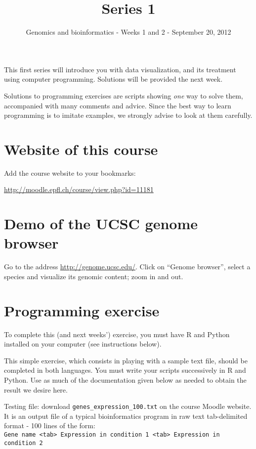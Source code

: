 \documentclass[a4paper,11pt]{article}
\title{Series 1}
\date{}
\author{Genomics and bioinformatics - Weeks 1 and 2 - September 20, 2012}
\begin{document}
\maketitle

This first series will introduce you with data visualization, and its treatment using computer programming.
Solutions will be provided the next week. 

Solutions to programming exercises are scripts showing \textit{one}
way to solve them, accompanied with many comments and advice. Since the best way to learn programming is to 
imitate examples, we strongly advise to look at them carefully.

\section{Website of this course}
Add the course website to your bookmarks:

\url{http://moodle.epfl.ch/course/view.php?id=11181}

\section{Demo of the UCSC genome browser}
Go to the address \url{http://genome.ucsc.edu/}. Click on ``Genome browser'', select a species
and visualize its genomic content; zoom in and out.

\section{Programming exercise}
To complete this (and next weeks') exercise, you must have R and Python installed on your computer (see instructions below).

This simple exercise, which consists in playing with a sample text file, should be completed in both languages. You must write your scripts successively in R and Python. Use as much of the documentation given below as needed to obtain the result we desire here.

Testing file: download \texttt{genes\_expression\_100.txt} on the course Moodle website. It is an output file of a typical bioinformatics program in raw text tab-delimited format - 100 lines of the form:\\

\texttt{Gene name <tab> Expression in condition 1 <tab> Expression in condition 2}\\
\end{document}
